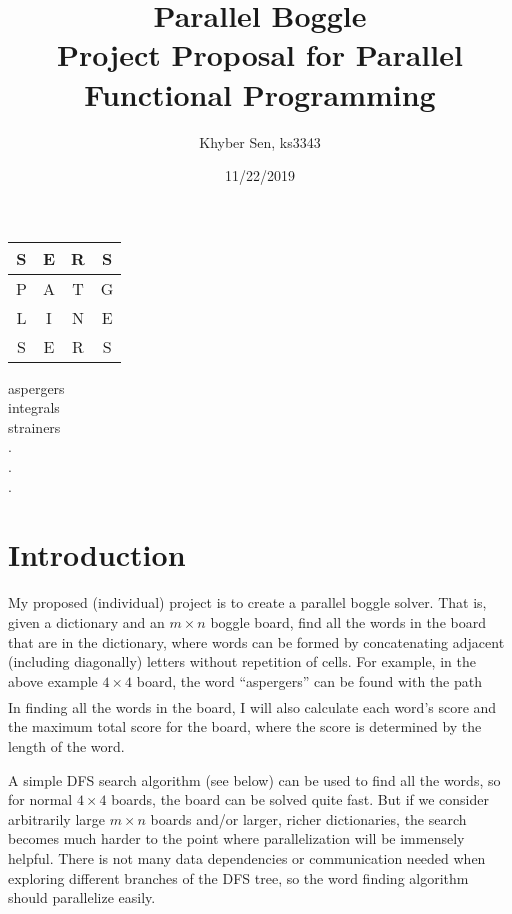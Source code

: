 \documentclass[fleqn]{article}
\title{
Parallel Boggle \\
\large $ $ \\
\Large Project Proposal for Parallel Functional Programming \\
$ $
}
\author{Khyber Sen, ks3343}
\date{11/22/2019}
\begin{document}
\maketitle

    \begin{center}
        \Huge
        \begin{tabular}{|c|c|c|c|}
            \hline
            S & E & R & S \\ \hline
            P & A & T & G \\ \hline
            L & I & N & E \\ \hline
            S & E & R & S \\ \hline
        \end{tabular}
        $ $ \\
        $ $ \\
        \Large
        aspergers \\
        integrals \\
        strainers \\
        . \\
        . \\
        . \\
    \end{center}

    \section{Introduction}
    My proposed (individual) project is to create a parallel boggle solver.  That is, given a dictionary and an $m \times n$ boggle board, find all the words in the board that are in the dictionary, where words can be formed by concatenating adjacent (including diagonally) letters without repetition of cells.  For example, in the above example $4 \times 4$ board, the word ``aspergers'' can be found with the path
    \begin{align}
        [A(1, 1), S(0, 0), P(1, 0), E(0, 1), R(0, 2), G(1, 3), E(2, 3), R(3, 2), S(3, 3)]
    \end{align}
    In finding all the words in the board, I will also calculate each word's score and the maximum total score for the board, where the score is determined by the length of the word.

    A simple DFS search algorithm (see below) can be used to find all the words, so for normal $4 \times 4$ boards, the board can be solved quite fast.  But if we consider arbitrarily large $m \times n$ boards and/or larger, richer dictionaries, the search becomes much harder to the point where parallelization will be immensely helpful.  There is not many data dependencies or communication needed when exploring different branches of the DFS tree, so the word finding algorithm should parallelize easily.
\end{document}
